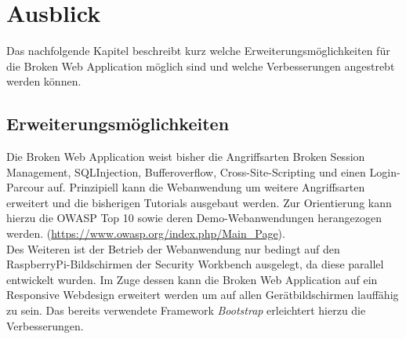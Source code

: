 \chapter{Ausblick}
\label{Ausblick}
Das nachfolgende Kapitel beschreibt kurz welche Erweiterungsmöglichkeiten für die Broken Web Application möglich sind und welche Verbesserungen angestrebt werden können.

\section{Erweiterungsmöglichkeiten}
\label{sec:erweiterungsmöglichkeiten}
Die Broken Web Application weist bisher die Angriffsarten Broken Session Management, SQLInjection, Bufferoverflow, Cross-Site-Scripting und einen Login-Parcour auf. Prinzipiell kann die Webanwendung um weitere Angriffsarten erweitert und die bisherigen Tutorials ausgebaut werden. Zur Orientierung kann hierzu die OWASP Top 10 sowie deren Demo-Webanwendungen herangezogen werden. (\url{https://www.owasp.org/index.php/Main_Page}). \\
Des Weiteren ist der Betrieb der Webanwendung nur bedingt auf den RaspberryPi-Bildschirmen der Security Workbench ausgelegt, da diese parallel entwickelt wurden. Im Zuge dessen kann die Broken Web Application auf ein Responsive Webdesign erweitert werden um auf allen Gerätbildschirmen lauffähig zu sein. Das bereits verwendete Framework \textit{Bootstrap} erleichtert hierzu die Verbesserungen.